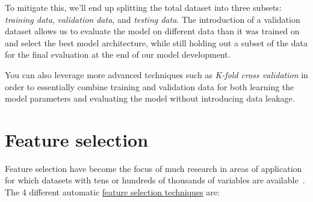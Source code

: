 \documentclass{book}
\begin{document}
To mitigate this, we'll end up splitting the total dataset into three subsets: \emph{training data}, \emph{validation data}, and \emph{testing data}. The introduction of a validation dataset allows us to evaluate the model on different data than it was trained on and select the best model architecture, while still holding out a subset of the data for the final evaluation at the end of our model development.

You can also leverage more advanced techniques such as \emph{K-fold cross validation} in order to essentially combine training and validation data for both learning the model parameters and evaluating the model without introducing data leakage.

\section{Feature selection}
Feature selection have become the focus of much research in areas of application for which datasets with tens or hundreds of thousands of variables are available~\cite{DBLP:journals/jmlr/GuyonE03}. The 4 different automatic \href{https://machinelearningmastery.com/feature-selection-machine-learning-python/}{feature selection techniques} are:
\end{document}
